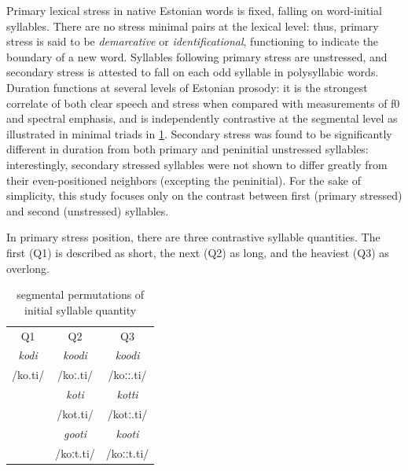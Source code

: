 Primary lexical stress in native Estonian words is fixed, falling on word-initial syllables. There are no stress minimal pairs at the lexical level: thus, primary stress is said to be {\it demarcative} or {\it identificational}\citep{lehiste1992}, functioning to indicate the boundary of a new word. Syllables following primary stress are unstressed, and secondary stress is attested to fall on each odd syllable in polysyllabic words. Duration functions at several levels of Estonian prosody: it is the strongest correlate of both clear speech and stress \citep{lippusAsuMari2014} when compared with measurements of f0 and spectral emphasis, and is independently contrastive at the segmental level as illustrated in minimal triads in \ref{qperm}. Secondary stress was found to be significantly different in duration from both primary and peninitial unstressed syllables: interestingly, secondary stressed syllables were not shown to differ greatly from their even-positioned neighbors (excepting the peninitial). For the sake of simplicity, this study focuses only on the contrast between first (primary stressed) and second (unstressed) syllables. 


In primary stress position, there are three contrastive syllable quantities. The first (Q1) is described as short, the next (Q2) as long, and the heaviest (Q3) as overlong. 



 \begin{table}[htb]
\centering
\begin{tabular}{ccc}
\hline
Q1 & Q2 & Q3 \\
{\it kodi	} 	& {\it koodi }	& {\it koodi }	\\  
/ko.ti/		& /koː.ti/	& /koːː.ti/	\\
\hline
		& {\it koti }	& {\it kotti}	 \\
		& /kot.ti/	& /kotː.ti/	\\
\hline
		& {\it gooti}	& {\it kooti} 	\\
		& /koːt.ti/	& /koːːt.ti/	\\
\hline
\end{tabular}
\label{qperm}
\caption{segmental permutations of initial syllable quantity}
\end{table}

